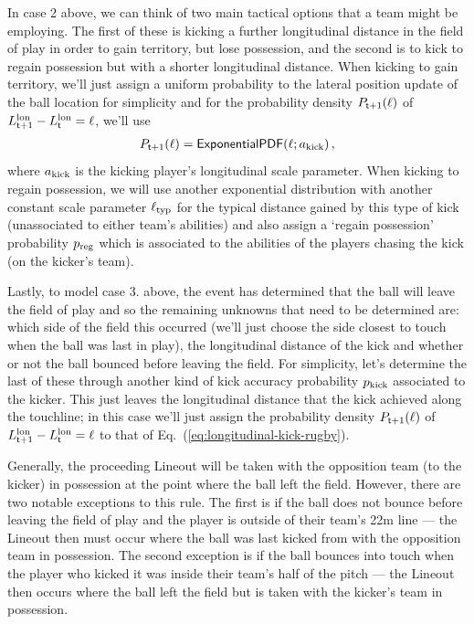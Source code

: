 In case 2 above, we can think of two main tactical options that a team might be employing. The first of these is kicking a further longitudinal distance in the field of play in order to gain territory, but lose possession, and the second is to kick to regain possession but with a shorter longitudinal distance. When kicking to gain territory, we'll just assign a uniform probability to the lateral position update of the ball location for simplicity and for the probability density $P_{{\sf t}+1}(\ell )$ of $L^{\rm lon}_{{\sf t}+1}-L^{\rm lon}_{{\sf t}}=\ell$, we'll use
\begin{align}
P_{{\sf t}+1}(\ell ) = {\sf ExponentialPDF}(\ell ; a_{\rm kick}) \label{eq:longitudinal-kick-rugby} \,,
\end{align}
where $a_{\rm kick}$ is the kicking player's longitudinal scale parameter. When kicking to regain possession, we will use another exponential distribution with another constant scale parameter $\ell_{\rm typ}$ for the typical distance gained by this type of kick (unassociated to either team's abilities) and also assign a `regain possession' probability $p_{\rm reg}$ which is associated to the abilities of the players chasing the kick (on the kicker's team).

Lastly, to model case 3. above, the event has determined that the ball will leave the field of play and so the remaining unknowns that need to be determined are: which side of the field this occurred (we'll just choose the side closest to touch when the ball was last in play), the longitudinal distance of the kick and whether or not the ball bounced before leaving the field. For simplicity, let's determine the last of these through another kind of kick accuracy probability $p_{\rm kick}$ associated to the kicker. This just leaves the longitudinal distance that the kick achieved along the touchline; in this case we'll just assign the probability density $P_{{\sf t}+1}(\ell )$ of $L^{\rm lon}_{{\sf t}+1}-L^{\rm lon}_{{\sf t}}=\ell$ to that of Eq.~(\ref{eq:longitudinal-kick-rugby}).

Generally, the proceeding {\sf Lineout} will be taken with the opposition team (to the kicker) in possession at the point where the ball left the field. However, there are two notable exceptions to this rule. The first is if the ball does not bounce before leaving the field of play and the player is outside of their team's 22m line --- the {\sf Lineout} then must occur where the ball was last kicked from with the opposition team in possession. The second exception is if the ball bounces into touch when the player who kicked it was inside their team's half of the pitch --- the {\sf Lineout} then occurs where the ball left the field but is taken with the kicker's team in possession. 

